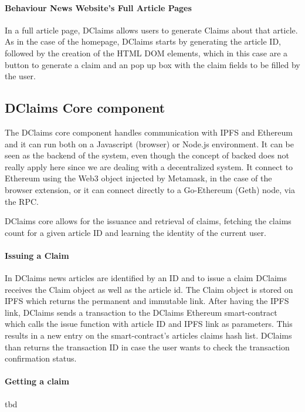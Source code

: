 \paragraph{Behaviour News Website’s Full Article Pages}
In a full article page, DClaims allows users to generate Claims about that article. As in the case of the homepage, DClaims starts by generating the article ID, followed by the creation of the HTML DOM elements, which in this case are a button to generate a claim and an pop up box with the claim fields to be filled by the user.

\subsection{DClaims Core component}

The DClaims core component handles communication with IPFS and Ethereum and it can run both on a Javascript (browser) or Node.js environment. It can be seen as the backend of the system, even though the concept of backed does not really apply here since we are dealing with a decentralized system.
 It connect to Ethereum using the Web3 object injected by Metamask, in the case of the browser extension, or it can connect directly to a Go-Ethereum (Geth) node, via the RPC.

DClaims core allows for the issuance and retrieval of claims, fetching the claims count for a given article ID and learning the identity of the current user.

\paragraph{Issuing a Claim}
In DClaims news articles are identified by an ID and to issue a claim DClaims receives the Claim object as well as the article id. The Claim object is stored on IPFS which returns the permanent and immutable link. After having the IPFS link, DClaims sends a transaction to the DClaims Ethereum smart-contract which calls the issue function with article ID and IPFS link as parameters. This results in a new entry on the smart-contract’s  articles claims hash list.
DClaims than returns the transaction ID in case the user wants to check the transaction confirmation status.

\paragraph{Getting a claim}
tbd

